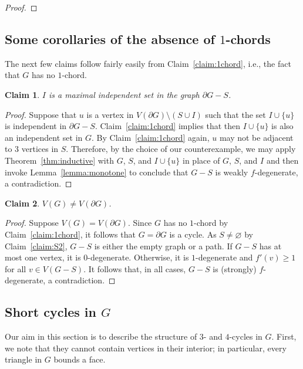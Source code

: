 \documentclass[11pt]{article}
\theoremstyle{slantthm}
\newtheorem{claim}{Claim}%
\numberwithin{equation}{section}
\theoremstyle{definition}
\renewcommand{\geq}{\geqslant}
\numberwithin{equation}{section}
\newcommand{\0}{\varnothing}
\newcommand{\set}[1]{\{#1\}}
\newcommand{\bdry}[1]{{\partial #1}}
\begin{document}
\begin{proof}
\end{proof}

\subsection{Some corollaries of the absence of $1$-chords}

    The next few claims follow fairly easily from Claim~\ref{claim:1chord}, i.e., the fact that $G$ has no $1$-chord.

\begin{claim}\label{claim:I_maximal}
    $I$ is a maximal independent set in the graph $\bdry{G} - S$.
\end{claim}
\begin{proof}
    Suppose that $u$ is a vertex in $V(\bdry{G}) \setminus (S \cup I)$ such that the set $I \cup \set{u}$ is independent in $\bdry{G} - S$. Claim~\ref{claim:1chord} implies that then $I \cup \set{u}$ is also an independent set in $G$.
    By Claim~\ref{claim:1chord} again, $u$ may not be adjacent to $3$ vertices in $S$. Therefore, by the choice of our counterexample, we may apply Theorem~\ref{thm:inductive} with $G$, $S$, and $I \cup \set{u}$ in place of $G$, $S$, and $I$ and then invoke Lemma~\ref{lemma:monotone} to conclude that $G - S$ is weakly $f$-degenerate, a contradiction.  %
\end{proof}

    \begin{claim}\label{claim:inside_exists}
        $V(G) \neq V(\bdry{G})$.
    \end{claim}
    \begin{proof}
        Suppose $V(G) = V(\bdry{G})$. Since $G$ has no $1$-chord by Claim~\ref{claim:1chord}, it follows that $G = \bdry{G}$ is a cycle. As $S \neq \0$ by Claim~\ref{claim:S2}, $G - S$ is either the empty graph or a path. If $G - S$ has at most one vertex, it is $0$-degenerate. Otherwise, it is $1$-degenerate and $f'(v) \geq 1$ for all $v \in V(G - S)$. It follows that, in all cases, $G - S$ is (strongly) $f$-degenerate, a contradiction.
    \end{proof}


    \subsection{Short cycles in $G$}

    Our aim in this section is to describe the structure of $3$- and $4$-cycles in $G$. First, we note that they cannot contain vertices in their interior; in particular, every triangle in $G$ bounds a face.
\end{document}

